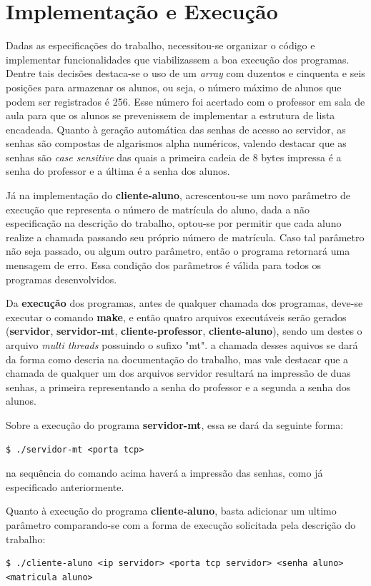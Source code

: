 \documentclass[10pt]{extarticle}
\begin{document}
\section{Implementação e Execução}
Dadas as especificações do trabalho, necessitou-se organizar o código e implementar funcionalidades que viabilizassem a boa execução dos programas. Dentre tais decisões destaca-se o uso de um \textit{array} com duzentos e cinquenta e seis posições para armazenar os alunos, ou seja, o número máximo de alunos que podem ser registrados é 256. Esse número foi acertado com o professor em sala de aula para que os alunos se prevenissem de implementar a estrutura de lista encadeada. Quanto à geração automática das senhas de acesso ao servidor, as senhas são compostas de algarismos alpha numéricos, valendo destacar que as senhas são \textit{case sensitive} das quais a primeira cadeia de 8 bytes impressa é a senha do professor e a última é a senha dos alunos.

Já na implementação do \textbf{cliente-aluno}, acrescentou-se um novo parâmetro de execução que representa o número de matrícula do aluno, dada a não especificação na descrição do trabalho, optou-se por permitir que cada aluno realize a chamada passando seu próprio número de matrícula. Caso tal parâmetro não seja passado, ou algum outro parâmetro, então o programa retornará uma mensagem de erro. Essa condição dos parâmetros é válida para todos os programas desenvolvidos.

Da \textbf{execução} dos programas, antes de qualquer chamada dos programas, deve-se executar o comando \textbf{make}, e então quatro arquivos executáveis serão gerados (\textbf{servidor}, \textbf{servidor-mt}, \textbf{cliente-professor}, \textbf{cliente-aluno}), sendo um destes o arquivo \textit{multi threads} possuindo o sufixo "mt". a chamada desses aquivos se dará da forma como descria na documentação do trabalho, mas vale destacar que a chamada de qualquer um dos arquivos servidor resultará na impressão de duas senhas, a primeira representando a senha do professor e a segunda a senha dos alunos.

Sobre a execução do programa \textbf{servidor-mt}, essa se dará da seguinte forma:
\lstset{language=bash}
    \begin{lstlisting}[frame=single]
$ ./servidor-mt <porta tcp>
    \end{lstlisting}
na sequência do comando acima haverá a impressão das senhas, como já especificado anteriormente.

Quanto à execução do programa \textbf{cliente-aluno}, basta adicionar um ultimo parâmetro comparando-se com a forma de execução solicitada pela descrição do trabalho:
\lstset{language=bash}
    \begin{lstlisting}[frame=single]
$ ./cliente-aluno <ip servidor> <porta tcp servidor> <senha aluno> 
<matricula aluno>
    \end{lstlisting}
\end{document}
